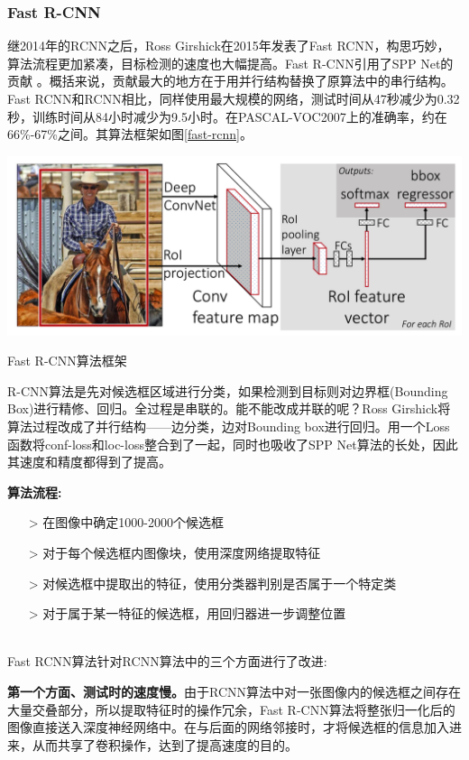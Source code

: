 \subsubsection{Fast R-CNN}
继2014年的RCNN之后，Ross Girshick在2015年发表了Fast RCNN\cite{fastrcnn}，构思巧妙，算法流程更加紧凑，目标检测的速度也大幅提高。Fast R-CNN引用了SPP Net的贡献 。概括来说，贡献最大的地方在于用并行结构替换了原算法中的串行结构。Fast RCNN和RCNN相比，同样使用最大规模的网络，测试时间从47秒减少为0.32秒，训练时间从84小时减少为9.5小时。在PASCAL-VOC2007上的准确率，约在66\%-67\%之间。其算法框架如图\ref{fast-rcnn}。
\begin{uscfigure}
	\includegraphics[width=\textwidth]{./Pictures/fast_rcnn.png}	
	\caption{Fast R-CNN算法框架}	
	\label{fast-rcnn}
\end{uscfigure}
R-CNN算法是先对候选框区域进行分类，如果检测到目标则对边界框(Bounding Box)进行精修、回归。全过程是串联的。能不能改成并联的呢？Ross Girshick将算法过程改成了并行结构——边分类，边对Bounding box进行回归。用一个Loss函数将conf-loss和loc-loss整合到了一起，同时也吸收了SPP Net算法的长处，因此其速度和精度都得到了提高。

\textbf{算法流程:}

\line
\begin{itemize}
	\setlength{\itemsep}{0pt}
	\setlength{\parsep}{0pt}
	\setlength{\parskip}{0pt}
	\item[>] 在图像中确定1000-2000个候选框 
	\item[>] 对于每个候选框内图像块，使用深度网络提取特征
	\item[>] 对候选框中提取出的特征，使用分类器判别是否属于一个特定类
	\item[>] 对于属于某一特征的候选框，用回归器进一步调整位置
\end{itemize}
\line\\
Fast RCNN算法针对RCNN算法中的三个方面进行了改进:

\textbf{第一个方面、测试时的速度慢。}由于RCNN算法中对一张图像内的候选框之间存在大量交叠部分，所以提取特征时的操作冗余，Fast R-CNN算法将整张归一化后的图像直接送入深度神经网络中。在与后面的网络邻接时，才将候选框的信息加入进来，从而共享了卷积操作，达到了提高速度的目的。

